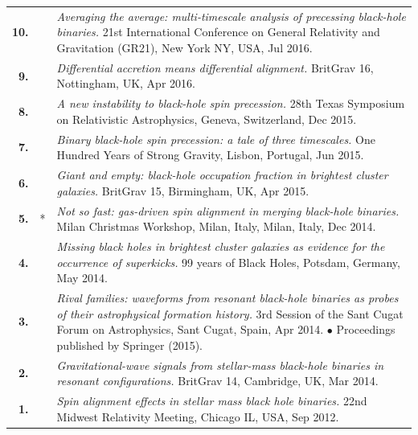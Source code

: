 {\begin{longtable}{rp{0.3cm}p{15.8cm}}
%
\textbf{10.} &  & \textit{Averaging the average: multi-timescale analysis of precessing black-hole binaries.}
\newline{}
21st International Conference on General Relativity and Gravitation (GR21), New York NY, USA, Jul 2016.
\vspace{0.05cm}\\
%
\textbf{9.} &  & \textit{Differential accretion means differential alignment.}
\newline{}
BritGrav 16, Nottingham, UK, Apr 2016.
\vspace{0.05cm}\\
%
\textbf{8.} &  & \textit{A new instability to black-hole spin precession.}
\newline{}
28th Texas Symposium on Relativistic Astrophysics, Geneva, Switzerland, Dec 2015.
\vspace{0.05cm}\\
%
\textbf{7.} &  & \textit{Binary black-hole spin precession: a tale of three timescales.}
\newline{}
One Hundred Years of Strong Gravity, Lisbon, Portugal, Jun 2015.
\vspace{0.05cm}\\
%
\textbf{6.} &  & \textit{Giant and empty: black-hole occupation fraction in brightest cluster galaxies.}
\newline{}
BritGrav 15, Birmingham, UK, Apr 2015.
\vspace{0.05cm}\\
%
\textbf{5.} & * & \textit{Not so fast: gas-driven spin alignment in merging black-hole binaries.}
\newline{}
Milan Christmas Workshop, Milan, Italy, Milan, Italy, Dec 2014.
\vspace{0.05cm}\\
%
\textbf{4.} &  & \textit{Missing black holes in brightest cluster galaxies as evidence for the occurrence of superkicks.}
\newline{}
99 years of Black Holes, Potsdam, Germany, May 2014.
\vspace{0.05cm}\\
%
\textbf{3.} &  & \textit{Rival families: waveforms from resonant black-hole binaries as probes of their astrophysical formation history.}
\newline{}
3rd Session of the Sant Cugat Forum on Astrophysics, Sant Cugat, Spain, Apr 2014.
\newline{}
\textcolor{color1}{$\bullet$} Proceedings published by Springer (2015).
\vspace{0.05cm}\\
%
\textbf{2.} &  & \textit{Gravitational-wave signals from stellar-mass black-hole binaries in resonant configurations.}
\newline{}
BritGrav 14, Cambridge, UK, Mar 2014.
\vspace{0.05cm}\\
%
\textbf{1.} &  & \textit{Spin alignment effects in stellar mass black hole binaries.}
\newline{}
22nd Midwest Relativity Meeting, Chicago IL, USA, Sep 2012.
\vspace{0.05cm}\\
%
\end{longtable} }
